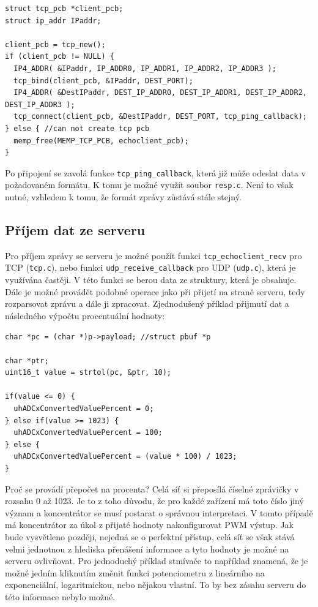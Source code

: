 \begin{verbatim}
struct tcp_pcb *client_pcb;
struct ip_addr IPaddr;

client_pcb = tcp_new();
if (client_pcb != NULL) {
  IP4_ADDR( &IPaddr, IP_ADDR0, IP_ADDR1, IP_ADDR2, IP_ADDR3 );
  tcp_bind(client_pcb, &IPaddr, DEST_PORT);
  IP4_ADDR( &DestIPaddr, DEST_IP_ADDR0, DEST_IP_ADDR1, DEST_IP_ADDR2, DEST_IP_ADDR3 );
  tcp_connect(client_pcb, &DestIPaddr, DEST_PORT, tcp_ping_callback);
} else { //can not create tcp pcb
  memp_free(MEMP_TCP_PCB, echoclient_pcb);
}
\end{verbatim}

Po připojení se zavolá funkce \texttt{tcp\_ping\_callback}, která již může odeslat data v požadovaném formátu. K tomu je možné využít soubor \texttt{resp.c}. Není to však nutné, vzhledem k tomu, že formát zprávy zůstává stále stejný.

\subsection{Příjem dat ze serveru}
Pro příjem zprávy se serveru je možné použít funkci \texttt{tcp\_echoclient\_recv} pro TCP (\texttt{tcp.c}), nebo funkci \texttt{udp\_receive\_callback} pro UDP (\texttt{udp.c}), která je využívána častěji. V této funkci se berou data ze struktury, která je obsahuje. Dále je možné provádět podobné operace jako při přijetí na straně serveru, tedy rozparsovat zprávu a dále ji zpracovat. Zjednodušený příklad přijmutí dat a následného výpočtu procentuální hodnoty:

\begin{verbatim}
char *pc = (char *)p->payload; //struct pbuf *p

char *ptr;
uint16_t value = strtol(pc, &ptr, 10);
	
if(value <= 0) {
  uhADCxConvertedValuePercent = 0;
} else if(value >= 1023) {
  uhADCxConvertedValuePercent = 100;
} else {
  uhADCxConvertedValuePercent = (value * 100) / 1023;
}
\end{verbatim}

Proč se provádí přepočet na procenta? Celá síť si přeposílá číselné zprá\-vič\-ky v rozsahu 0 až 1023. Je to z toho důvodu, že pro každé zařízení má toto číslo jiný význam a koncentrátor se musí postarat o správnou interpretaci. V tomto případě má koncentrátor za úkol z přijaté hodnoty nakonfigurovat PWM výstup. Jak bude vysvětleno později, nejedná se o perfektní přístup, celá síť se však stává velmi jednotnou z hlediska přenášení informace a tyto hodnoty je možné na serveru ovlivňovat. Pro jednoduchý příklad stmívače to například znamená, že je možné jedním kliknutím změnit funkci potenciometru z lineárního na exponenciální, logaritmickou, nebo nějakou vlastní. To by bez zásahu serveru do této informace nebylo možné.

